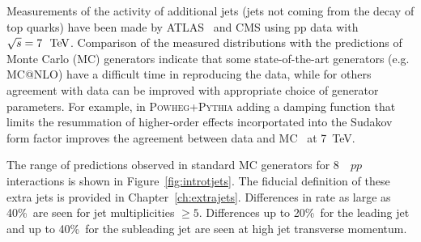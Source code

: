 Measurements of the activity of additional jets (jets not coming from the decay of top quarks)
have been made by ATLAS~\cite{gapfraction,hdamp,ljets} and CMS\cite{Chatrchyan:2014gma} using
pp data with $\sqrt{s}=7~\TeV$.  Comparison of the measured distributions with the predictions of Monte Carlo (MC) generators
indicate that some state-of-the-art generators (e.g. \textsc{MC@NLO}) have a difficult time in reproducing the data,
while for others  agreement with data can be improved with appropriate
choice of generator parameters.  For example, in \textsc{Powheg+Pythia} adding a damping
function that limits the resummation of higher-order effects incorportated into  the Sudakov form factor improves
the agreement between data and MC~\cite{hdamp} at 7~TeV.  

The range of predictions observed in standard MC generators for
8~\TeV\ $pp$ interactions is shown in 
Figure~\ref{fig:introtjets}. The fiducial definition of these extra jets is provided in Chapter~\ref{ch:extrajets}.  
Differences in rate as large as 40\%\  are seen for
jet multiplicities $\ge 5$.  Differences up to 20\%\ for the leading
jet and up to 40\%\ for the subleading jet are seen at high jet transverse
momentum.  
